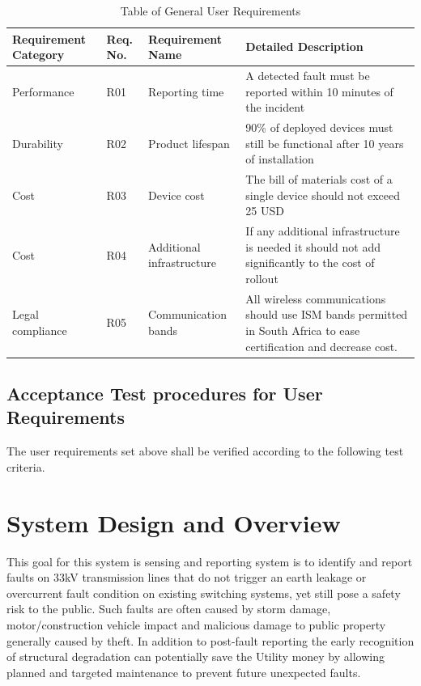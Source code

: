 \documentclass[12pt]{article}
\begin{document}
\begin{center}
  \begin{table}[htp!]
    \caption{Table of General User Requirements}
    
    \hskip-1.2cm\begin{tabular}{|p{3cm}|p{2cm}|p{4cm}|p{9cm}|}
        \hline
        \textbf{Requirement Category} & \textbf{Req. No.} & \textbf{Requirement Name} & \textbf{Detailed Description} \\
        \hline
        Performance & R01 & Reporting time & A detected fault must be reported within 10 minutes of the incident \\\hline
        Durability & R02 & Product lifespan & 90\% of deployed devices must still be functional after 10 years of installation \\\hline
        Cost & R03 & Device cost & The bill of materials cost of a single device should not exceed 25 USD \\\hline
        Cost & R04 & Additional infrastructure & If any additional infrastructure is needed it should not add significantly
        to the cost of rollout \\\hline
        Legal compliance & R05 & Communication bands & All wireless communications should use ISM bands permitted in South Africa
        to ease certification and decrease cost. \\\hline
  
    \end{tabular}    
  
  \label{tab:usreq}
  \end{table}
\end{center}

\subsection{Acceptance Test procedures for User Requirements}
The user requirements set above shall be verified according to the following test criteria.


\section{System Design and Overview}

This goal for this system is sensing and reporting system is to identify and report faults on 33kV transmission
lines that do not trigger an earth leakage or overcurrent fault condition on existing switching systems, yet
still pose a safety risk to the public. Such faults are often caused by storm damage, motor/construction vehicle
impact and malicious damage to public property generally caused by theft. In addition to post-fault reporting the
early recognition of structural degradation can potentially save the Utility money by allowing planned and
targeted maintenance to prevent future unexpected faults. 
\end{document}
